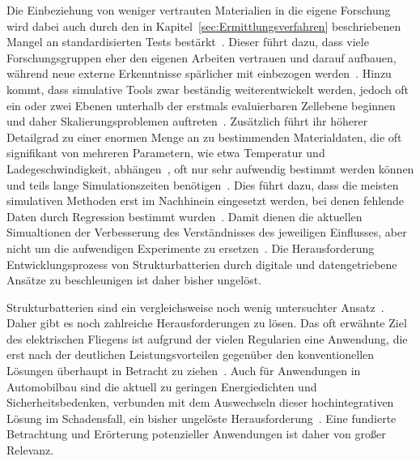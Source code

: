 Die Einbeziehung von weniger vertrauten Materialien in die eigene Forschung wird dabei auch durch den in Kapitel~\ref{sec:Ermittlungsverfahren} beschriebenen Mangel an standardisierten Tests bestärkt~\cite{Greenhalgh2024a}. Dieser führt dazu, dass viele Forschungsgruppen eher den eigenen Arbeiten vertrauen und darauf aufbauen, während neue externe Erkenntnisse spärlicher mit einbezogen werden~\cite{Greenhalgh2023, Greenhalgh2024a}. Hinzu kommt, dass simulative Tools zwar beständig weiterentwickelt werden, jedoch oft ein oder zwei Ebenen unterhalb der erstmals evaluierbaren Zellebene beginnen und daher Skalierungsproblemen auftreten~\cite{Franco2019,Giessen2020}. Zusätzlich führt ihr höherer Detailgrad zu einer enormen Menge an zu bestimmenden Materialdaten, die oft signifikant von mehreren Parametern, wie etwa Temperatur und Ladegeschwindigkeit, abhängen~\cite{Duan2021,Carlstedt2022b}, oft nur sehr aufwendig bestimmt werden können und teils lange Simulationszeiten benötigen~\cite{Franco2019,Carlstedt2022}. Dies führt dazu, dass die meisten simulativen Methoden erst im Nachhinein eingesetzt werden, bei denen fehlende Daten durch Regression bestimmt wurden~\cite{Carlstedt2022a, Carlstedt2023}. Damit dienen die aktuellen Simualtionen der Verbesserung des Verständnisses des jeweiligen Einflusses, aber nicht um die aufwendigen Experimente zu ersetzen~\cite{Franco2013}. Die Herausforderung Entwicklungsprozess von Strukturbatterien durch digitale und datengetriebene Ansätze zu beschleunigen ist daher bisher ungelöst.

Strukturbatterien sind ein vergleichsweise noch wenig untersuchter Ansatz~\cite{Asp2024}. Daher gibt es noch zahlreiche Herausforderungen zu lösen. Das oft erwähnte Ziel des elektrischen Fliegens ist aufgrund der vielen Regularien eine Anwendung, die erst nach der deutlichen Leistungsvorteilen gegenüber den konventionellen Lösungen überhaupt in Betracht zu ziehen~\cite{Scholz2018,Schaefer2018,Ishfaq2022}. Auch für Anwendungen in Automobilbau sind die aktuell zu geringen Energiedichten und Sicherheitsbedenken, verbunden mit dem Auswechseln dieser hochintegrativen Lösung im Schadensfall, ein bisher ungelöste Herausforderung~\cite{Kalnaus2021,Martins2021, Carlstedt2020a}. Eine fundierte Betrachtung und Erörterung potenzieller Anwendungen ist daher von großer Relevanz.

